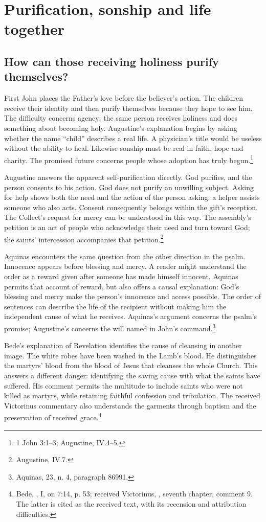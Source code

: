 \newpage
\section{Purification, sonship and life together}
\subsection{How can those receiving holiness purify themselves?}
First John places the Father's love before the believer's action. The children receive their identity and then purify themselves because they hope to see him. The difficulty concerns agency: the same person receives holiness and does something about becoming holy. Augustine's explanation begins by asking whether the name ``child'' describes a real life. A physician's title would be useless without the ability to heal. Likewise sonship must be real in faith, hope and charity. The promised future concerns people whose adoption has truly begun.\footnote{1 John 3:1--3; Augustine,  IV.4--5.}

Augustine answers the apparent self-purification directly. God purifies, and the person consents to his action. God does not purify an unwilling subject. Asking for help shows both the need and the action of the person asking: a helper assists someone who also acts. Consent consequently belongs within the gift's reception. The Collect's request for mercy can be understood in this way. The assembly's petition is an act of people who acknowledge their need and turn toward God; the saints' intercession accompanies that petition.\footnote{Augustine,  IV.7.}

Aquinas encounters the same question from the other direction in the psalm. Innocence appears before blessing and mercy. A reader might understand the order as a reward given after someone has made himself innocent. Aquinas permits that account of reward, but also offers a causal explanation: God's blessing and mercy make the person's innocence and access possible. The order of sentences can describe the life of the recipient without making him the independent cause of what he receives. Aquinas's argument concerns the psalm's promise; Augustine's concerns the will named in John's command.\footnote{Aquinas,  23, n. 4, paragraph 86991.}

Bede's explanation of Revelation identifies the cause of cleansing in another image. The white robes have been washed in the Lamb's blood. He distinguishes the martyrs' blood from the blood of Jesus that cleanses the whole Church. This answers a different danger: identifying the saving cause with what the saints have suffered. His comment permits the multitude to include saints who were not killed as martyrs, while retaining faithful confession and tribulation. The received Victorinus commentary also understands the garments through baptism and the preservation of received grace.\footnote{Bede, , I, on 7:14, p. 53; received Victorinus, , seventh chapter, comment 9. The latter is cited as the received text, with its recension and attribution difficulties.}

